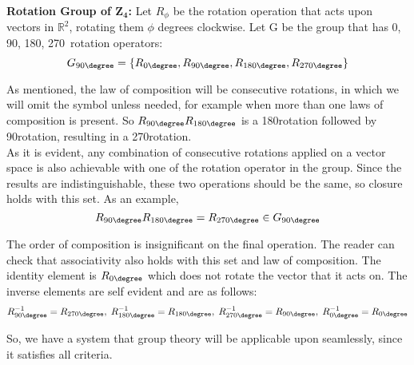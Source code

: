 \begin{example}
 \label{ex:rotation_z4}
\textbf{Rotation Group of $\mathbf{Z_4}$:}
\label{cyclic_group}
Let $R_\phi$ be the rotation operation that acts upon vectors in $\mathbb{R}^2$, rotating them $\phi$ degrees clockwise. Let G be the group that has 0\degree, 90\degree, 180\degree, 270\degree \ rotation operators:
%
\[ G_{90\degree} = \{ R_{0\degree}, R_{90\degree}, R_{180\degree}, R_{270\degree}\}\]

As mentioned, the law of composition will be consecutive rotations, in which we will omit the symbol unless needed, for example when more than one laws of composition is present. So $R_{90\degree}R_{180\degree}$ is a 180\degree rotation followed by 90\degree rotation, resulting in a 270\degree rotation.\\

As it is evident, any combination of consecutive rotations applied on a vector space is also achievable with one of the rotation operator in the group. Since the results are indistinguishable, these two operations should be the same, so closure holds with this set. As an example,
%
\[R_{90\degree}R_{180\degree} = R_{270\degree} \in G_{90\degree}\]

The order of composition is insignificant on the final operation. The reader can check that associativity also holds with this set and law of composition. The identity element is $ R_{0\degree} $ which does not rotate the vector that it acts on. The inverse elements are self evident and are as follows:
%
\[R_{90\degree}^{-1} = R_{270\degree}, \; R_{180\degree}^{-1} = R_{180\degree}, \; R_{270\degree}^{-1} = R_{90\degree}, \;R_{0\degree}^{-1} = R_{0\degree}\]

So, we have a system that group theory will be applicable upon seamlessly, since it satisfies all criteria.
\end{example}
%
